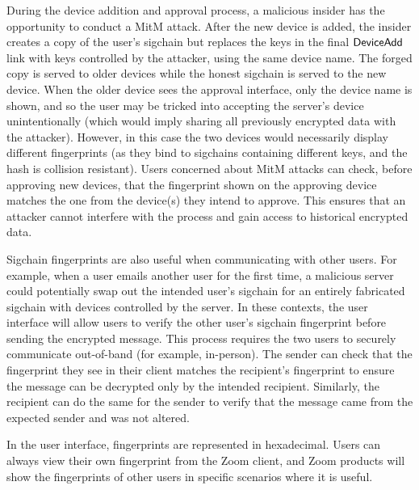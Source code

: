 During the device addition and approval process, a malicious insider has the opportunity to conduct
a MitM attack. After the new device is added, the insider creates a copy of the user's sigchain but
replaces the keys in the final $\mathsf{DeviceAdd}{}$ link with keys controlled by the attacker, using the
same device name. The forged copy is served to older devices while the honest sigchain is served to
the new device. When the older device sees the approval interface, only the device name is shown,
and so the user may be tricked into accepting the server's device unintentionally (which would imply
sharing all previously encrypted data with the attacker). However, in this case the two devices
would necessarily display different fingerprints (as they bind to sigchains containing different
keys, and the hash is collision resistant). Users concerned about MitM attacks can check, before
approving new devices, that the fingerprint shown on the approving device matches the one from the
device(s) they intend to approve. This ensures that an attacker cannot interfere with the process
and gain access to historical encrypted data.

Sigchain fingerprints are also useful when communicating with other users. For example, when a user
emails another user for the first time, a malicious server could potentially swap out the intended
user's sigchain for an entirely fabricated sigchain with devices controlled by the server. In these
contexts, the user interface will allow users to verify the other user's sigchain fingerprint before
sending the encrypted message. This process requires the two users to securely communicate
out-of-band (for example, in-person). The sender can check that the fingerprint they see in their
client matches the recipient's fingerprint to ensure the message can be decrypted only by the
intended recipient. Similarly, the recipient can do the same for the sender to verify that the
message came from the expected sender and was not altered.

In the user interface, fingerprints are represented in hexadecimal. Users can always view their own
fingerprint from the Zoom client, and Zoom products will show the fingerprints of other users in
specific scenarios where it is useful.

